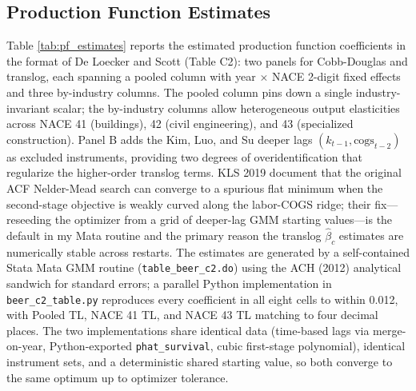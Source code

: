 \documentclass[11pt]{article}
\begin{document}
\subsection{Production Function Estimates}\label{sec:pf_coefs}

Table \ref{tab:pf_estimates} reports the estimated production function coefficients in the format of De Loecker and Scott \cite{DeLoeckerScott2025} (Table C2): two panels for Cobb-Douglas and translog, each spanning a pooled column with year $\times$ NACE 2-digit fixed effects and three by-industry columns. The pooled column pins down a single industry-invariant scalar; the by-industry columns allow heterogeneous output elasticities across NACE 41 (buildings), 42 (civil engineering), and 43 (specialized construction). Panel B adds the Kim, Luo, and Su \cite{KimLuoSu2019JAE} deeper lags $(k_{t-1}, \text{cogs}_{t-2})$ as excluded instruments, providing two degrees of overidentification that regularize the higher-order translog terms. KLS 2019 document that the original ACF Nelder-Mead search can converge to a spurious flat minimum when the second-stage objective is weakly curved along the labor-COGS ridge; their fix---reseeding the optimizer from a grid of deeper-lag GMM starting values---is the default in my Mata routine and the primary reason the translog $\hat\beta_c$ estimates are numerically stable across restarts. The estimates are generated by a self-contained Stata Mata GMM routine (\texttt{table\_beer\_c2.do}) using the ACH (2012) analytical sandwich for standard errors; a parallel Python implementation in \texttt{beer\_c2\_table.py} reproduces every coefficient in all eight cells to within 0.012, with Pooled TL, NACE 41 TL, and NACE 43 TL matching to four decimal places. The two implementations share identical data (time-based lags via merge-on-year, Python-exported \texttt{phat\_survival}, cubic first-stage polynomial), identical instrument sets, and a deterministic shared starting value, so both converge to the same optimum up to optimizer tolerance.
\end{document}

